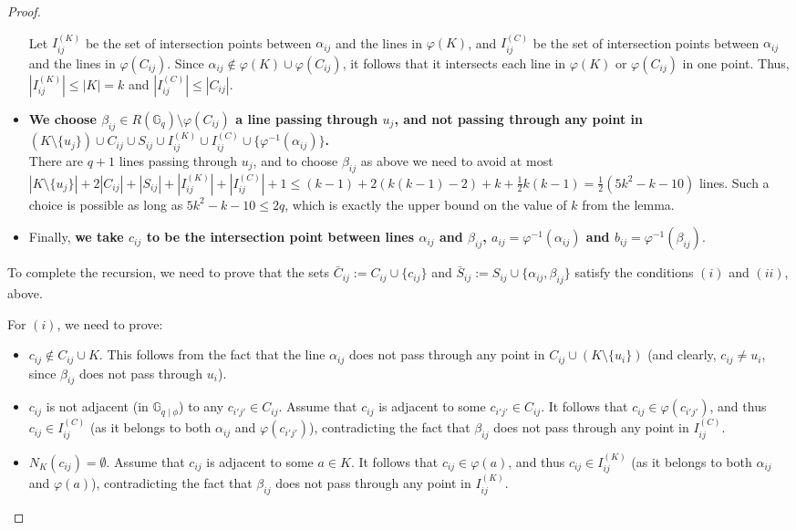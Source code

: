 \documentclass[a4paper,UKenglish,cleveref, autoref, thm-restate]{arxiv}
\newcommand{\ls}{\leqslant}
\newcommand{\G}[1][q]{\mathbb{G}_{#1}}
\newcommand{\Gphi}[1][q]{\mathbb{G}_{#1\mid\phi}}
\begin{document}
\begin{proof}
\begin{itemize}
        Let $I_{ij}^{(K)}$ be the set of intersection points between $\alpha_{ij}$ and the lines in $\varphi(K)$, and $I_{ij}^{(C)}$ be the set of intersection points between $\alpha_{ij}$ and the lines in $\varphi(C_{ij})$. Since $\alpha_{ij} \not\in \varphi(K) \cup \varphi(C_{ij})$, it follows that it intersects each line in $\varphi(K)$ or $\varphi(C_{ij})$ in one point. Thus, $|I_{ij}^{(K)}| \ls |K| = k$ and $|I_{ij}^{(C)}| \ls |C_{ij}|$.

        \item \textbf{We choose $\beta_{ij}\in R(\G) \setminus \varphi(C_{ij})$ a line passing through $u_j$, and not passing through any point in $(K \setminus \{u_j\}) \cup C_{ij} \cup S_{ij} \cup I_{ij}^{(K)} \cup I_{ij}^{(C)} \cup \{ \varphi^{-1}(\alpha_{ij}) \}$.} \\
        There are $q+1$ lines passing through $u_j$, and to choose $\beta_{ij}$ as above we need to avoid at most  $|K \setminus \{u_j\}| + 2|C_{ij}| + |S_{ij}| + |I_{ij}^{(K)}| + |I_{ij}^{(C)}| + 1 \ls (k-1) + 2(k(k-1)-2) + k + \frac{1}{2}k(k-1) = \frac{1}{2}(5k^2 -k -10)$ lines.  Such a choice is possible as long as  $5k^2 -k -10 \ls 2q$, which is exactly the upper bound on the value of $k$ from the lemma.

        \item Finally, \textbf{we take $c_{ij}$ to be the intersection point between lines $\alpha_{ij}$ and $\beta_{ij}$, $a_{ij} = \varphi^{-1}(\alpha_{ij})$ and $b_{ij} = \varphi^{-1}(\beta_{ij})$}.
    \end{itemize}

     To complete the recursion, we need to prove that the sets $\bar{C}_{ij} := C_{ij} \cup\{c_{ij}\}$ and $\bar{S}_{ij} := S_{ij} \cup\{\alpha_{ij}, \beta_{ij}\}$ satisfy the conditions  $(i)$ and  $(ii)$, above.

    \smallskip \noindent For $(i)$, we need to prove:
    \begin{itemize}%
        \item $c_{ij} \not\in C_{ij}\cup K$. This follows from the fact that the line $\alpha_{ij}$ does not pass through any point in $ C_{ij}\cup (K \setminus \{u_i\})$ (and clearly, $c_{ij} \neq u_i$, since $\beta_{ij}$ does not pass through $u_i$).
        \item $c_{ij} $ is not adjacent (in $\Gphi$) to any $c_{i'j'}\in C_{ij}$. Assume that $c_{ij} $ is  adjacent to some $c_{i'j'}\in C_{ij}$. It follows that $c_{ij} \in  \varphi(c_{i'j'})$, and thus $c_{ij}\in I_{ij}^{(C)}$ (as it belongs to both $\alpha_{ij}$ and $\varphi(c_{i'j'})$), contradicting the fact that $\beta_{ij}$ does not pass through any point in $I_{ij}^{(C)}$.
        \item $N_K(c_{ij})  = \emptyset$. Assume that $c_{ij} $ is  adjacent to some $a \in K$. It follows that $c_{ij} \in  \varphi(a)$, and thus $c_{ij}\in I_{ij}^{(K)}$ (as it belongs to both $\alpha_{ij}$ and $\varphi(a)$), contradicting the fact that $\beta_{ij}$ does not pass through any point in $I_{ij}^{(K)}$.
    \end{itemize}


\end{proof}
\end{document}
